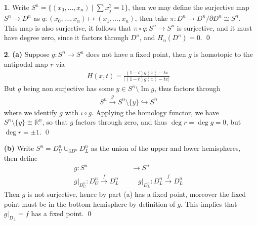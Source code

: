 \documentclass[10.5pt]{article}
\theoremstyle{definition}
\newtheorem{pb}{}
\newcommand{\set}[1]{\{#1\}}
\newcommand{\abs}[1]{\left\vert#1\right\vert}
\begin{document}
    \begin{pb}
        Write \(S^{n} = \set{(x_0,\hdots,x_n) \mid \sum x_j^2 = 1}\), then we may define the surjective map \(S^n \to D^n\) as \(q: (x_0,\hdots,x_n) \mapsto (x_1,\hdots,x_n)\), then take \(\pi: D^n \to D^n/\partial D^n \cong S^n\). This map is also surjective, it follows that \(\pi\circ q: S^n \to S^n\) is surjective, and it must have degree zero, since it factors through \(D^n\), and \(H_n(D^n) = 0\). \qed
    \end{pb}
    \begin{pb}
        \textbf{(a)} Suppose \(g: S^n \to S^n\) does not have a fixed point, then \(g\) is homotopic to the antipodal map \(r\) via
        \begin{align*}
            H(x,t) = \frac{(1-t)g(x) - tx}{\abs{(1-t)g(x) - tx}}
        \end{align*}
        But \(g\) being non surjective has some \(y \in S^n \setminus \operatorname{Im}g\), thus factors through
        \begin{align*}
            S^n \overset{g}{\longrightarrow} S^n\setminus \set{y} \hookrightarrow S^n
        \end{align*}
        where we identify \(g\) with \(\iota \circ g\). Applying the homology functor, we have \(S^n \setminus \set{y} \cong \mathbb{R}^n\), so that \(g\) factors through zero, and thus \(\deg r = \deg g = 0\), but \(\deg r = \pm 1\). \qed

        \textbf{(b)} Write \(S^n = D^n_U \cup_{\partial D^n} D^n_L\) as the union of the upper and lower hemispheres, then define
        \begin{align*}
            g:S^n &\to S^n \\
            g\vert_{D^n_U}: D^n_U \overset{f}{\to} D^n_L \quad & \quad  g\vert_{D^n_L}: D^n_L \overset{f}{\to} D^n_L
        \end{align*}
        Then \(g\) is not surjective, hence by part (a) has a fixed point, moreover the fixed point must be in the bottom hemisphere by definition of \(g\). This implies that \(g\vert_{D_L} = f\) has a fixed point. \qed
    \end{pb}
\end{document}

